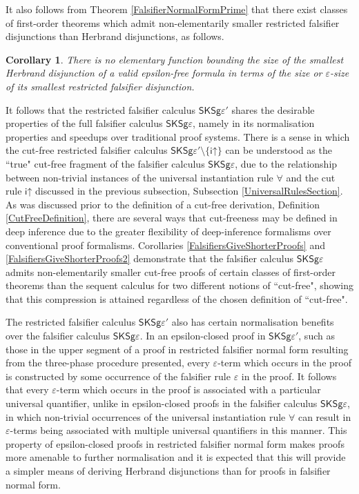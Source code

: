 \documentclass[10pt]{article}
\newtheorem{corollary}[theorem]{Corollary}
\theoremstyle{definition}\newtheorem{remark}[theorem]{Remark}
\theoremstyle{definition}\newtheorem{example}[theorem]{Example}
\theoremstyle{definition}\newtheorem{definition}[theorem]{Definition}
\newcommand{\FalsifierCalculus}{{\mathsf{SKSg\varepsilon}}}
\newcommand{\FalsifierCalculusPrime}{{\mathsf{SKSg\varepsilon'}}}
\newcommand{\iUp}{{\mathsf{i\mathord\uparrow}}}
\newcommand{\falsifierRule}{{\mathsf{\varepsilon}}}
\begin{document}
	It also follows from Theorem \ref{FalsifierNormalFormPrime} that there exist classes of first-order theorems which admit non-elementarily smaller restricted falsifier disjunctions than Herbrand disjunctions, as follows.
	
	\begin{corollary}\label{FalsifierDisjunctionsSmallerThanHerbrand2}
		There is no elementary function bounding the size of the smallest Herbrand disjunction of a valid epsilon-free formula in terms of the size or $\varepsilon$-size of its smallest restricted falsifier disjunction.
	\end{corollary}

	It follows that the restricted falsifier calculus $\FalsifierCalculusPrime$ shares the desirable properties of the full falsifier calculus $\FalsifierCalculus$, namely in its normalisation properties and speedups over traditional proof systems. There is a sense in which the cut-free restricted falsifier calculus $\FalsifierCalculusPrime \setminus \{\iUp\}$ can be understood as the ``true" cut-free fragment of the falsifier calculus $\FalsifierCalculus$, due to the relationship between non-trivial instances of the universal instantiation rule $\forall$ and the cut rule $\iUp$ discussed in the previous subsection, Subsection \ref{UniversalRulesSection}. As was discussed prior to the definition of a cut-free derivation, Definition \ref{CutFreeDefinition}, there are several ways that cut-freeness may be defined in deep inference due to the greater flexibility of deep-inference formalisms over conventional proof formalisms. Corollaries \ref{FalsifiersGiveShorterProofs} and \ref{FalsifiersGiveShorterProofs2} demonstrate that the falsifier calculus $\FalsifierCalculus$ admits non-elementarily smaller cut-free proofs of certain classes of first-order theorems than the sequent calculus for two different notions of ``cut-free", showing that this compression is attained regardless of the chosen definition of ``cut-free".
	
	The restricted falsifier calculus $\FalsifierCalculusPrime$ also has certain normalisation benefits over the falsifier calculus $\FalsifierCalculus$. In an epsilon-closed proof in $\FalsifierCalculusPrime$, such as those in the upper segment of a proof in restricted falsifier normal form resulting from the three-phase procedure presented, every $\varepsilon$-term which occurs in the proof is constructed by some occurrence of the falsifier rule $\falsifierRule$ in the proof. It follows that every $\varepsilon$-term which occurs in the proof is associated with a particular universal quantifier, unlike in epsilon-closed proofs in the falsifier calculus $\FalsifierCalculus$, in which non-trivial occurrences of the universal instantiation rule $\forall$ can result in $\varepsilon$-terms being associated with multiple universal quantifiers in this manner. This property of epsilon-closed proofs in restricted falsifier normal form makes proofs more amenable to further normalisation and it is expected that this will provide a simpler means of deriving Herbrand disjunctions than for proofs in falsifier normal form.
	
\end{document}

